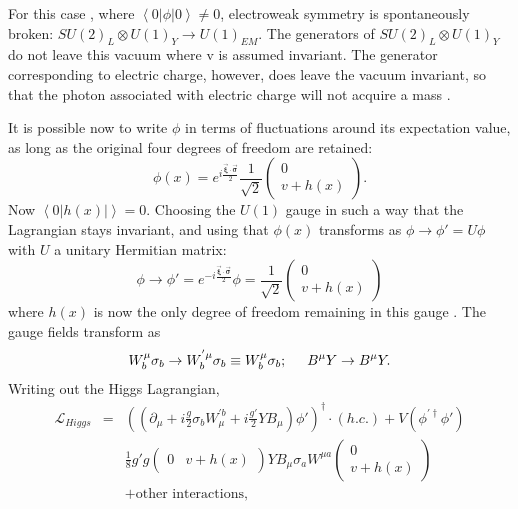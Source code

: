 For this case , where $\left< 0 | \phi | 0\right> \neq 0$,  electroweak symmetry is spontaneously broken: $SU(2)_L\otimes U(1)_Y \to U(1)_{EM}$.
The generators of $SU(2)_L \otimes U(1)_Y$ do not leave this vacuum where v is assumed invariant. The generator corresponding to electric charge, however, does leave the vacuum invariant, so that the photon associated with electric charge will not acquire a mass \cite{quigg1983gauge}.

It is possible now to write $\phi$ in terms of fluctuations around its expectation value, as long as the original four degrees of freedom are retained:
\begin{equation}
\phi(x) = e^{i\frac{\boldsymbol{\vec{\xi}\cdot\overrightarrow{\sigma}}}{2}}\frac{1}{\sqrt{2}}\left( \begin{array}{c} 0 \\ v + h(x) \end{array} \right).
\label{eqn:phifluctuations}
\end{equation}
Now $\left<0|h(x)|\right> = 0$. Choosing the $U(1)$ gauge in such a way that the Lagrangian stays invariant, and using that $\phi(x)$ transforms as $\phi \rightarrow \phi' = U \phi$ with $U$ a unitary Hermitian matrix:
\begin{equation}
\phi \rightarrow \phi' =  e^{-i\frac{\boldsymbol{\vec{\xi}\cdot\vec{\sigma}}}{2}} \phi = \frac{1}{\sqrt{2}}\left( \begin{array}{c} 0 \\ v + h(x) \end{array} \right)
\label{eqn:trfmphigaugeU}
\end{equation}
where $h(x)$ is now the only degree of freedom remaining in this gauge \cite{roubillard2005th}. The gauge fields transform as
\begin{equation}
W^\mu_b\sigma_b \rightarrow W^{'\mu}_b\sigma_b \equiv  W^{\mu}_b\sigma_b; \hspace{5mm} B^\mu Y \rightarrow B^\mu Y.
\label{eqn:trfmWBbosons}
\end{equation}
Writing out the Higgs Lagrangian,
\begin{eqnarray}
\mathcal L_{Higgs} &=&  ((\partial_\mu + i\frac{g}{2}\sigma_bW_\mu^{'b} + i\frac{g'}{2}YB_\mu)\phi')^\dag \cdot (h.c.) + V(\phi^{'\dag}\phi') \nonumber \\
&&  \frac{1}{8}g'g \left( \begin{array}{cc} 0 & v + h(x) \end{array} \right) YB_\mu\sigma_aW^{\mu a} \left( \begin{array}{c} 0 \\ v + h(x) \end{array} \right) \nonumber \\
&& + \mbox{other interactions},
\label{eqn:LHiggsvaried}
\end{eqnarray}

